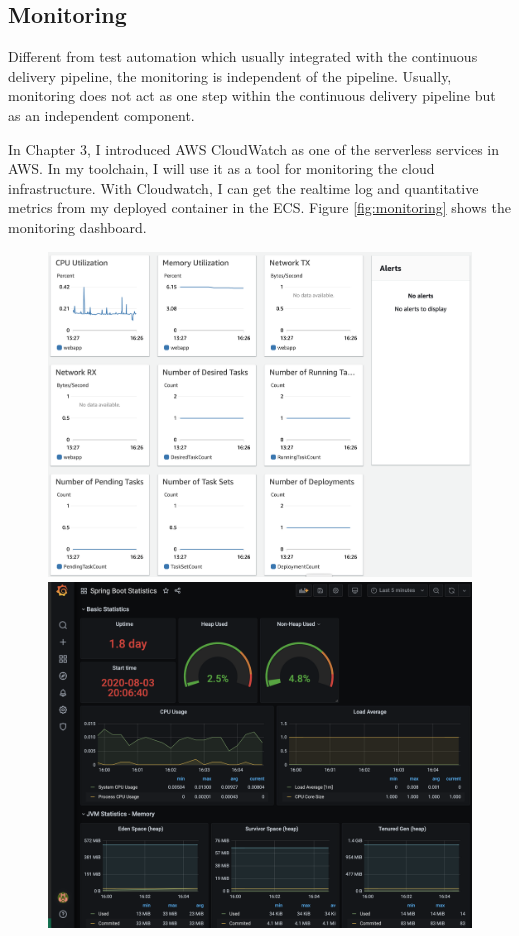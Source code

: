 \subsection{Monitoring}
Different from test automation which usually integrated with the continuous delivery pipeline, the monitoring is independent of the pipeline. Usually, monitoring does not act as one step within the continuous delivery pipeline but as an independent component.
\par
In Chapter 3, I introduced AWS CloudWatch as one of the serverless services in AWS. In my toolchain, I will use it as a tool for monitoring the cloud infrastructure. With Cloudwatch, I can get the realtime log and quantitative metrics from my deployed container in the ECS. Figure \ref{fig:monitoring} shows the monitoring dashboard.
\begin{figure}[!tbp]
     \centering
     \begin{minipage}[b]{0.47\textwidth}
       \includegraphics[width=\textwidth]{pics/monitoring.png}
     \end{minipage}
     \hfill
     \begin{minipage}[b]{0.50\textwidth}
       \includegraphics[width=\textwidth]{pics/grafana.png}

\end{minipage}
\end{figure}

